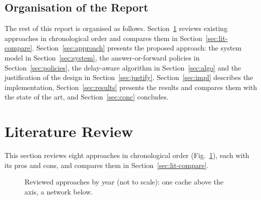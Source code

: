 \documentclass[11pt,a4paper]{article}
\begin{document}
\subsection{Organisation of the Report}
The rest of this report is organised as follows. Section~\ref{sec:lit} reviews existing approaches
in chronological order and compares them in Section~\ref{sec:lit-compare}.
Section~\ref{sec:approach} presents the proposed approach: the system model in
Section~\ref{sec:system}, the answer-or-forward policies in Section~\ref{sec:policies}, the
delay-aware algorithm in Section~\ref{sec:algo} and the justification of the design in
Section~\ref{sec:justify}.\ifdefined\FinalReport{} Section~\ref{sec:impl} describes the
implementation, Section~\ref{sec:results} presents the results and compares them with the state of
the art, and Section~\ref{sec:conc} concludes.\fi

\section{Literature Review}\label{sec:lit}

This section reviews eight approaches in chronological order (Fig.~\ref{fig:timeline}), each
with its pros and cons, and compares them in Section~\ref{sec:lit-compare}.

\begin{figure}[H]
\centering
{}
\caption{Reviewed approaches by year (not to scale): one cache above the axis, a network below.}
\label{fig:timeline}
\end{figure}
\end{document}
